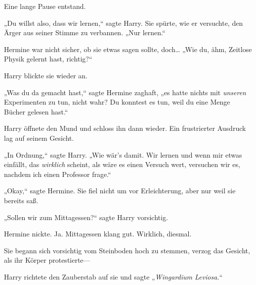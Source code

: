 Eine lange Pause entstand.

„Du willst also, dass wir lernen,“ sagte Harry. Sie spürte, wie er versuchte, den Ärger aus seiner Stimme zu verbannen. „Nur lernen.“

Hermine war nicht sicher, ob sie etwas sagen sollte, doch… „Wie du, ähm, Zeitlose Physik gelernt hast, richtig?“

Harry blickte sie wieder an.

„Was du da gemacht hast,“ sagte Hermine zaghaft, „es hatte nichts mit \emph{unseren} Experimenten zu tun, nicht wahr? Du konntest es tun, weil du eine Menge Bücher gelesen hast.“

Harry öffnete den Mund und schloss ihn dann wieder. Ein frustrierter Ausdruck lag auf seinem Gesicht.

„In Ordnung,“ sagte Harry. „Wie wär's damit. Wir lernen und wenn mir etwas einfällt, das \emph{wirklich} scheint, als wäre es einen Versuch wert, versuchen wir es, nachdem ich einen Professor frage.“

„Okay,“ sagte Hermine. Sie fiel nicht um vor Erleichterung, aber nur weil sie bereits saß.

„Sollen wir zum Mittagessen?“ sagte Harry vorsichtig.

Hermine nickte. Ja. Mittagessen klang gut. Wirklich, diesmal.

Sie begann sich vorsichtig vom Steinboden hoch zu stemmen, verzog das Gesicht, als ihr Körper protestierte—

Harry richtete den Zauberstab auf sie und sagte „\emph{Wingardium Leviosa.}“


